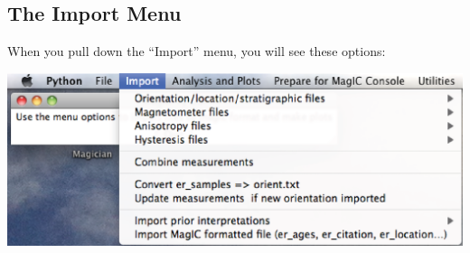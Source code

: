\documentclass[11pt]{book}
\begin{document}
{ 
 \subsection{The Import Menu}
 When you pull down the ``Import'' menu, you will see these options:
 
 \includegraphics[width=15cm]{EPSfiles/ImportMenu.eps}
 
}
\end{document}
